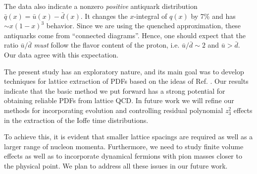  The data also indicate a nonzero {\it positive}  antiquark distribution $\bar q (x) = \bar u(x) - \bar d(x)$.
 It changes the $x$-integral of $q(x)$ by 7\% and has $\sim x (1-x)^3$ behavior.
 Since we are using the quenched approximation, these antiquarks come from
 ``connected diagrams''. Hence,  one should expect that the ratio $\bar u/\bar d$
 {\it must}  follow the flavor content of the proton, i.e. $\bar u/\bar d \sim 2$ and $\bar u >\bar d$.
 Our data agree with this expectation.

 The  present study has an exploratory nature, and its main goal was to  develop techniques
 for lattice extraction of PDFs
  based on the ideas of Ref. \cite{Radyushkin:2017cyf}.
  Our results indicate that the basic method we put forward has a strong potential for obtaining
  reliable PDFs from lattice QCD. In future work we will refine our methods for incorporating evolution and controlling residual polynomial $z_3^2$ effects in the extraction of the Ioffe time distributions.

 To achieve this,
 it is evident that smaller lattice spacings are required  as  well as a  larger range of nucleon  momenta.  Furthermore, we need to study finite volume effects as well
 as to  incorporate dynamical fermions with pion masses closer to the physical point. We plan to  address all these issues in our future work.
